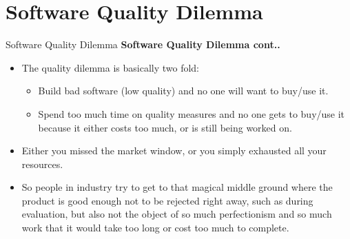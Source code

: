 \documentclass{beamer}
\begin{document}
\section{Software Quality Dilemma}
\begin{frame}{Software Quality Dilemma}
	\textbf{Software Quality Dilemma cont..}
	\begin{itemize}
		\item The quality dilemma is basically two fold:
		\begin{itemize}
			\item Build bad software (low quality) and no one will want to buy/use it.
			\item Spend too much time on quality measures and no one gets to buy/use it because it either costs too much, or is still being worked on.
		\end{itemize}
		\item Either you missed the market window, or you simply exhausted all your resources.  
		\item So people in industry try to get to that magical middle ground where the product is good enough not to be rejected right away, such as during evaluation, but also not the object of so much perfectionism and so much work that it would take too long or cost too much to complete.
	\end{itemize}
\end{frame}
\end{document}
